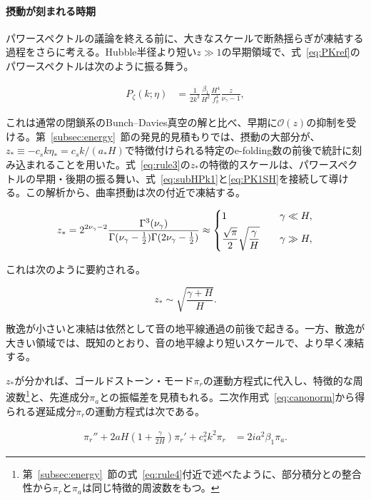 \documentclass[a4paper,11pt]{ltjsarticle}
\numberwithin{equation}{section}
\def\pia{\pi_{a}}
\def\pir{\pi_{r}}
\newcommand{\Eq}[1]{Eq.~(\ref{#1})}
\newcommand{\Eqs}[1]{Eqs.~(\ref{#1})}
\newcommand{\Sec}[1]{Sec.~\ref{#1}}
\renewcommand{\Eq}[1]{式~\eqref{#1}}
\renewcommand{\Eqs}[1]{式~\eqref{#1}}
\renewcommand{\Sec}[1]{第~\ref{#1}~節}
\begin{document}
\paragraph{摂動が刻まれる時期} パワースペクトルの議論を終える前に、大きなスケールで断熱揺らぎが凍結する過程をさらに考える。Hubble半径より短い$z\gg1$の早期領域で、\Eq{eq:PKref}のパワースペクトルは次のように振る舞う。

\begin{align}\label{eq:subHPk1}
    P_\zeta(k;\eta) &=  \frac{1}{2k^3} \frac{\beta_{1}}{H^2} \frac{H^4}{f_\pi^4} \frac{z}{\nu_\gamma-1},
\end{align}

これは通常の閉鎖系のBunch--Davies真空の解と比べ、早期に$\mathcal O(z)$の抑制を受ける。\Sec{subsec:energy}の発見的見積もりでは、摂動の大部分が、$z_*\equiv-c_sk\eta_*=c_sk/(a_*H)$で特徴付けられる特定のe-folding数の前後で統計に刻み込まれることを用いた。\Eq{eq:rule3}の$z_*$の特徴的スケールは、パワースペクトルの早期・後期の振る舞い、\Eqs{eq:subHPk1}と\eqref{eq:PK1SH}を接続して導ける。この解析から、曲率摂動は次の付近で凍結する。

\begin{equation}
z_{*}=2^{2\nu_\gamma-2}\frac{\Gamma^{3}(\nu_\gamma)}{\Gamma(\nu_\gamma-\frac{1}{2})\Gamma(2\nu_\gamma-\frac{1}{2})} \approx \begin{dcases}
	1 & \gamma \ll H,\\
	\frac{\sqrt{\pi}}{2}\sqrt{\frac{\gamma}{H}} \quad & \gamma \gg H,
\end{dcases}
\end{equation}

これは次のように要約される。

\begin{equation}\label{eq:zstar}
    z_{*}\sim\sqrt{\frac{\gamma+H}{H}}. 
\end{equation}

散逸が小さいと凍結は依然として音の地平線通過の前後で起きる。一方、散逸が大きい領域では、既知のとおり、音の地平線より短いスケールで、より早く凍結する\cite{LopezNacir:2011kk,Creminelli:2023aly}。

$z_*$が分かれば、ゴールドストーン・モード$\pir$の運動方程式に代入し、特徴的な周波数\footnote{\Sec{subsec:energy}の\Eq{eq:rule4}付近で述べたように、部分積分との整合性から$\pir$と$\pia$は同じ特徴的周波数をもつ。}と、先進成分$\pia$との振幅差を見積もれる。二次作用\Eq{eq:canonorm}から得られる遅延成分$\pir$の運動方程式は次である。

\begin{align}
	\pir''+2aH\left(1+\frac{\gamma}{2H}\right)\pir'+c_{s}^{2}k^{2}\pir&=2ia^{2}\beta_{1}\pia.\label{eq:eompir}
\end{align}
\end{document}
